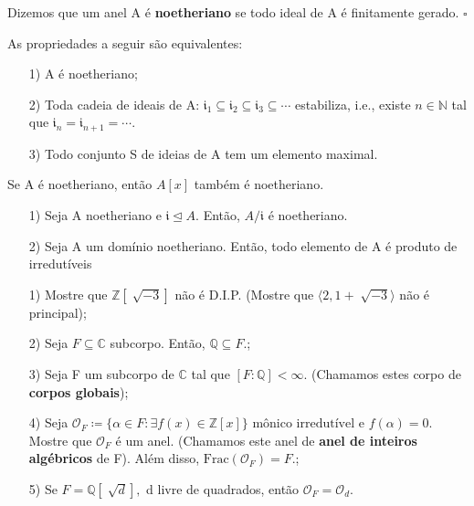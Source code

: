 \documentclass[AlgebraII/algebraII_notes.tex]{subfiles}
\begin{document}
\begin{def*}
	Dizemos que um anel A é \textbf{noetheriano} se todo ideal de A é finitamente gerado. \(\square\)
\end{def*}
\begin{prop*}[Exercício]
	As propriedades a seguir são equivalentes:
	\begin{itemize}
		\item[1)] A é noetheriano;
		\item[2)] Toda cadeia de ideais de A: \(\mathfrak{i}_{1}\subseteq{}\mathfrak{i}_{2}\subseteq{}\mathfrak{i}_{3}\subseteq{\cdots}\) estabiliza, i.e.,
		      existe \(n\in \mathbb{N}\) tal que \(\mathfrak{i}_{n} = \mathfrak{i}_{n+1} = \cdots.\)
		\item[3)] Todo conjunto S de ideias de A tem um elemento maximal.
	\end{itemize}
\end{prop*}
\begin{theorem*}
	Se A é noetheriano, então \(A[x]\) também é noetheriano.
\end{theorem*}
\begin{prop*}[Exercícios]
	\begin{itemize}
		\item[1)] Seja A noetheriano e \(\mathfrak{i}\trianglelefteq{A}.\) Então, \(A/\mathfrak{i}\) é noetheriano.
		\item[2)] Seja A um domínio noetheriano. Então, todo elemento de A é produto de irredutíveis
	\end{itemize}
\end{prop*}
\begin{example}
	\begin{itemize}
		\item[1)] Mostre que \(\mathbb{Z}[\sqrt[]{-3}]\) não é D.I.P. (Mostre que \(\langle 2, 1 + \sqrt[]{-3} \rangle\) não é principal);
		\item[2)] Seja \(F\subseteq{\mathbb{C}}\) subcorpo. Então, \(\mathbb{Q}\subseteq{F}.\);
		\item[3)] Seja F um subcorpo de \(\mathbb{C}\) tal que \([F:\mathbb{Q}]<\infty\). (Chamamos estes corpo de \textbf{corpos globais});
		\item[4)] Seja \(\mathcal{O}_{F}\coloneqq \{\alpha \in F: \exists f(x)\in \mathbb{Z}[x]\} \text{ mônico irredutível e } f(\alpha ) = 0\). Mostre que
		      \(\mathcal{O}_{F}\) é um anel. (Chamamos este anel de \textbf{anel de inteiros algébricos} de F). Além disso, \(\mathrm{Frac}(\mathcal{O}_{F}) = F.\);
		\item[5)] Se \(F = \mathbb{Q}[\sqrt[]{d}],\) d livre de quadrados, então \(\mathcal{O}_{F} = \mathcal{O}_{d}.\)
	\end{itemize}
\end{example}
\end{document}
